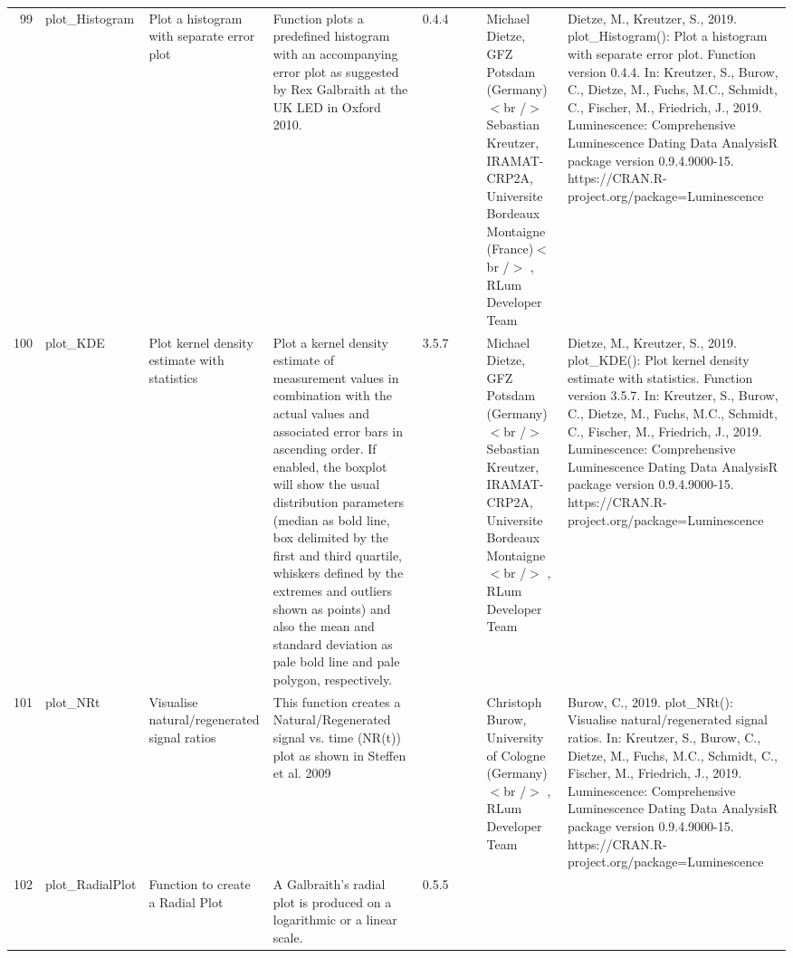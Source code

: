 \begin{table}[ht]
\begin{tabular}{rllllllll}
 \\ 
  99 & plot\_Histogram & Plot a histogram with separate error plot & Function plots a predefined histogram with an accompanying error plot as suggested by Rex Galbraith at the UK LED in Oxford 2010. & 0.4.4
 &  &  & Michael Dietze, GFZ Potsdam (Germany) $<$br /$>$ Sebastian Kreutzer, IRAMAT-CRP2A, Universite Bordeaux Montaigne (France)$<$br /$>$ , RLum Developer Team & Dietze, M., Kreutzer, S., 2019. plot\_Histogram(): Plot a histogram with separate error plot. Function version 0.4.4. In: Kreutzer, S., Burow, C., Dietze, M., Fuchs, M.C., Schmidt, C., Fischer, M., Friedrich, J., 2019. Luminescence: Comprehensive Luminescence Dating Data AnalysisR package version 0.9.4.9000-15. https://CRAN.R-project.org/package=Luminescence
 \\ 
  100 & plot\_KDE & Plot kernel density estimate with statistics & Plot a kernel density estimate of measurement values in combination with the actual values and associated error bars in ascending order. If enabled, the boxplot will show the usual distribution parameters (median as bold line, box delimited by the first and third quartile, whiskers defined by the extremes and outliers shown as points) and also the mean and standard deviation as pale bold line and pale polygon, respectively. & 3.5.7
 &  &  & Michael Dietze, GFZ Potsdam (Germany) $<$br /$>$ Sebastian Kreutzer, IRAMAT-CRP2A, Universite Bordeaux Montaigne$<$br /$>$ , RLum Developer Team & Dietze, M., Kreutzer, S., 2019. plot\_KDE(): Plot kernel density estimate with statistics. Function version 3.5.7. In: Kreutzer, S., Burow, C., Dietze, M., Fuchs, M.C., Schmidt, C., Fischer, M., Friedrich, J., 2019. Luminescence: Comprehensive Luminescence Dating Data AnalysisR package version 0.9.4.9000-15. https://CRAN.R-project.org/package=Luminescence
 \\ 
  101 & plot\_NRt & Visualise natural/regenerated signal ratios & This function creates a Natural/Regenerated signal vs. time (NR(t)) plot as shown in Steffen et al. 2009 &  &  &  & Christoph Burow, University of Cologne (Germany)$<$br /$>$ , RLum Developer Team & Burow, C., 2019. plot\_NRt(): Visualise natural/regenerated signal ratios. In: Kreutzer, S., Burow, C., Dietze, M., Fuchs, M.C., Schmidt, C., Fischer, M., Friedrich, J., 2019. Luminescence: Comprehensive Luminescence Dating Data AnalysisR package version 0.9.4.9000-15. https://CRAN.R-project.org/package=Luminescence
 \\ 
  102 & plot\_RadialPlot & Function to create a Radial Plot & A Galbraith's radial plot is produced on a logarithmic or a linear scale. & 0.5.5

\end{tabular}
\end{table}
